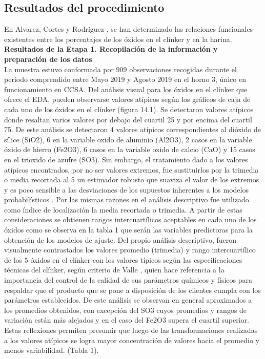 \documentclass[spanish]{report}
\begin{document}
\subsection{Resultados del procedimiento}
En Alvarez, Cortes y Rodríguez \cite{alvarez2019ecuaciones}, se han determinado las relaciones funcionales existentes entre los porcentajes de los óxidos en el clínker y en la harina. \\

\textbf{Resultados de la Etapa 1. Recopilación de la información y preparación de los datos}\\

La muestra estuvo conformada por 909 observaciones recogidas durante el período comprendido entre Mayo 2019 y Agosto 2019 en el horno 3, único en funcionamiento en CCSA. Del análisis visual para los óxidos en el clínker que ofrece el EDA, pueden observarse valores atípicos según los gráficos de caja de cada uno de los óxidos en el clínker (figura 14.1). Se detectaron valores atípicos donde resaltan varios valores por debajo del cuartil 25 y por encima del cuartil 75. De este análisis se detectaron 4 valores atípicos correspondientes al dióxido de sílice (SiO2), 6 en la variable oxido de aluminio (Al2O3), 2 casos en la variable óxido de hierro (Fe2O3), 6 casos en la variable oxido de calcio (CaO) y 15 casos en el trioxido de azufre (SO3). Sin embargo, el tratamiento dado a los valores atípicos encontrados, por no ser valores extremos, fue sustituirlos por la trimedia o media recortada al 5 un estimador robusto que suaviza el valor de los extremos y es poco sensible a las desviaciones de los supuestos inherentes a los modelos probabilísticos \cite{blanxart1992analisis}. Por las mismas razones en el análisis descriptivo fue utilizado como índice de localización la media recortada o trimedia. A partir de estas consideraciones se obtienen rangos intercuartílicos aceptables en cada uno de los óxidos como se observa en la tabla 1 que serán las variables predictoras para la obtención de los modelos de ajuste. Del propio análisis descriptivo, fueron visualmente contrastados los valores promedio (trimedia) y rango intercuartílico de los 5 óxidos en el clínker con los valores típicos según las especificaciones técnicas del clínker, según criterio de Valle \cite{valle2019modelo}, quien hace referencia a la importancia del control de la calidad de sus parámetros químicos y físicos para respaldar que el producto que se pone a disposición de los clientes cumpla con los parámetros establecidos. De este análisis se observan en general aproximados a los promedios obtenidos, con excepción del SO3 cuyos promedios y rangos de variación están más alejados y en el caso del Fe2O3 supera el cuartil superior. Estas reflexiones permiten presumir que luego de las transformaciones realizadas a los valores atípicos se logra mayor concentración de valores hacia el promedio y menos variabilidad. (Tabla 1).\\
\end{document}
